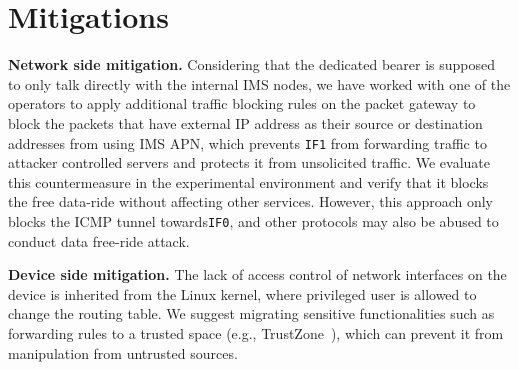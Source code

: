 \section{Mitigations}
\label{sec:background}
\textbf{Network side mitigation. }Considering that the dedicated bearer is supposed to only talk directly with the internal IMS nodes, we have worked with one of the operators to apply additional traffic blocking rules on the packet gateway to block the packets that have external IP address as their source or destination addresses from using IMS APN, which prevents \texttt{IF1} from forwarding traffic to attacker controlled servers and protects it from unsolicited traffic. We evaluate this countermeasure in the experimental environment and verify that it blocks the free data-ride without affecting other services. However, this approach only blocks the ICMP tunnel towards\texttt{IF0}, and other protocols may also be abused to conduct data free-ride attack. 

\textbf{Device side mitigation. }The lack of access control of network interfaces on the device is inherited from the Linux kernel, where privileged user is allowed to change the routing table. We suggest migrating sensitive functionalities such as forwarding rules to a trusted space (e.g., TrustZone~\cite{trustzone}), which can prevent it from manipulation from untrusted sources.
